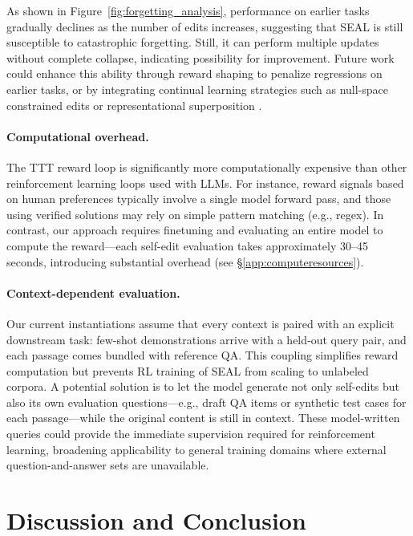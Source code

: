 \documentclass{article}
\newcommand{\methodacronym}{SEAL\xspace}
\begin{document}
As shown in Figure~\ref{fig:forgetting_analysis}, performance on earlier tasks gradually declines as the number of edits increases, suggesting that \methodacronym is still susceptible to catastrophic forgetting. Still, it can perform multiple updates without complete collapse, indicating possibility for improvement. Future work could enhance this ability through reward shaping \citep{hu2020learning, xie2023text2reward, fu2025reward} to penalize regressions on earlier tasks, or by integrating continual learning strategies such as null-space constrained edits \citep{fang2025alphaeditnullspaceconstrainedknowledge} or representational superposition \citep{cheung2019superpositionmodels}.

\paragraph{Computational overhead.} The TTT reward loop is significantly more computationally expensive than other reinforcement learning loops used with LLMs. For instance, reward signals based on human preferences typically involve a single model forward pass, and those using verified solutions may rely on simple pattern matching (e.g., regex). In contrast, our approach requires finetuning and evaluating an entire model to compute the reward---each self-edit evaluation takes approximately 30–45 seconds, introducing substantial overhead (see \S\ref{app:computeresources}).

\paragraph{Context-dependent evaluation.}  Our current instantiations assume that every context is paired with an explicit downstream task: few-shot demonstrations arrive with a held‑out query pair, and each passage comes bundled with reference QA. This coupling simplifies reward computation but prevents RL training of \methodacronym from scaling to unlabeled corpora. A potential solution is to let the model generate not only self-edits but also its own evaluation questions---e.g., draft QA items or synthetic test cases for each passage---while the original content is still in context. These model-written queries could provide the immediate supervision required for reinforcement learning, broadening applicability to general training domains where external question-and-answer sets are unavailable.

\section{Discussion and Conclusion}
\end{document}

